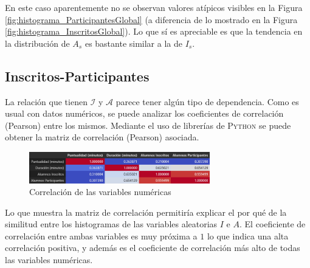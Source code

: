 \documentclass[11pt,a4paper]{book}
\theoremstyle{definition}%
\begin{document}
                En este caso aparentemente no se observan valores atípicos visibles en la Figura \ref{fig:histograma_ParticipantesGlobal} (a diferencia de lo mostrado en la Figura \ref{fig:histograma_InscritosGlobal}). Lo que sí es apreciable es que la tendencia en la distribución de $A_s$ es bastante similar a la de $I_s$.
            \subsection{Inscritos-Participantes}
                La relación que tienen $\mathcal{I}$ y $\mathcal{A}$ parece tener algún tipo de dependencia. Como es usual con datos numéricos, se puede analizar los coeficientes de correlación (Pearson) entre los mismos. Mediante el uso de librerías de \textsc{Python} se puede obtener la matriz de correlación (Pearson) asociada.
                \begin{figure}[H]
                    \centering
                    \includegraphics[width=0.7\textwidth]{Sources/corrmatrix_NumericalFeatures.png}
                    \caption{Correlación de las variables numéricas}
                    \label{fig:corrmatrix_NumericalFeatures}
                \end{figure}
                Lo que muestra la matriz de correlación permitiría explicar el por qué de la similitud entre los histogramas de las variables aleatorias $I$ e $A$. El coeficiente de correlación entre ambas variables es muy próxima a $1$ lo que indica una alta correlación positiva, y además es el coeficiente de correlación más alto de todas las variables numéricas.
                
\end{document}
